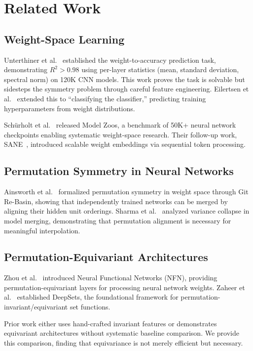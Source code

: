 \section{Related Work}

\subsection{Weight-Space Learning}

Unterthiner et al.~\cite{unterthiner2020predicting} established the weight-to-accuracy prediction task, demonstrating $R^2 > 0.98$ using per-layer statistics (mean, standard deviation, spectral norm) on 120K CNN models. This work proves the task is solvable but sidesteps the symmetry problem through careful feature engineering. Eilertsen et al.~\cite{eilertsen2020classifying} extended this to ``classifying the classifier,'' predicting training hyperparameters from weight distributions.

Sch{\"u}rholt et al.~\cite{schurholt2022model} released Model Zoos, a benchmark of 50K+ neural network checkpoints enabling systematic weight-space research. Their follow-up work, SANE~\cite{schurholt2024sane}, introduced scalable weight embeddings via sequential token processing.

\subsection{Permutation Symmetry in Neural Networks}

Ainsworth et al.~\cite{ainsworth2022git} formalized permutation symmetry in weight space through Git Re-Basin, showing that independently trained networks can be merged by aligning their hidden unit orderings. Sharma et al.~\cite{sharma2024nonlocal} analyzed variance collapse in model merging, demonstrating that permutation alignment is necessary for meaningful interpolation.

\subsection{Permutation-Equivariant Architectures}

Zhou et al.~\cite{zhou2023neural} introduced Neural Functional Networks (NFN), providing permutation-equivariant layers for processing neural network weights. Zaheer et al.~\cite{zaheer2017deep} established DeepSets, the foundational framework for permutation-invariant/equivariant set functions.

Prior work either uses hand-crafted invariant features or demonstrates equivariant architectures without systematic baseline comparison. We provide this comparison, finding that equivariance is not merely efficient but necessary.
